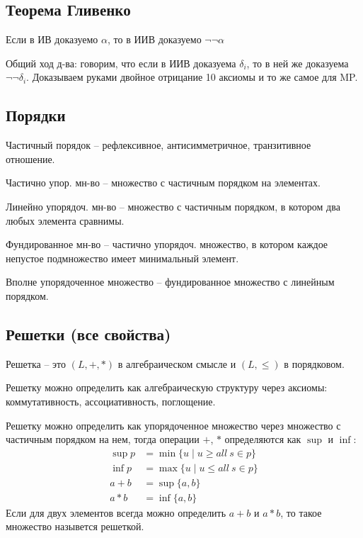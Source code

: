 \subsection{Теорема Гливенко}
\label{sec-2-6}
\begin{theorem}[Гливенко]
Если в ИВ доказуемо $\alpha$, то в ИИВ доказуемо $\lnot \lnot \alpha$
\end{theorem}

Общий ход д-ва: говорим, что если в ИИВ доказуема $\delta_{i}$,
то в ней же доказуема $\lnot \lnot \delta_{i}$. Доказываем руками двойное
отрицание 10 аксиомы и то же самое для MP.
\subsection{Порядки}
\label{sec-2-7}
\begin{definition}
    Частичный порядок – рефлексивное, антисимметричное, транзитивное
отношение.
\end{definition}
\begin{definition}
    Частично упор. мн-во -- множество с частичным порядком на элементах.
\end{definition}
\begin{definition}
    Линейно упорядоч. мн-во -- множество с частичным порядком, в котором
    два любых элемента сравнимы.
\end{definition}
\begin{definition}
    Фундированное мн-во -- частично упорядоч. множество, в котором каждое
    непустое подмножество имеет минимальный элемент.
\end{definition}
\begin{definition}
    Вполне упорядоченное множество -- фундированное множество с линейным
    порядком.
\end{definition}
\subsection{Решетки (все свойства)}
\label{sec-2-8}
\begin{definition}
    Решетка -- это $(L, +, *)$ в алгебраическом смысле
    и $(L, \le)$ в порядковом.
\end{definition}

Решетку можно определить как алгебраическую структуру через
аксиомы: коммутативность, ассоциативность, поглощение.

Решетку можно определить как упорядоченное множество через
множество с частичным порядком на нем, тогда операции $+$, $*$ определяются
как $\sup$ и $\inf$:
\begin{align*}
    \sup p &= \min \{u \mid u \ge all\ s \in p\} \\
    \inf p &= \max \{u \mid u \le all\ s \in p\} \\
    a + b  &= \sup \{a, b\} \\
    a * b  &= \inf \{a, b\}
\end{align*}
Если для двух элементов всегда можно определить $a + b$ и $a * b$, то такое
множество назывется решеткой.

